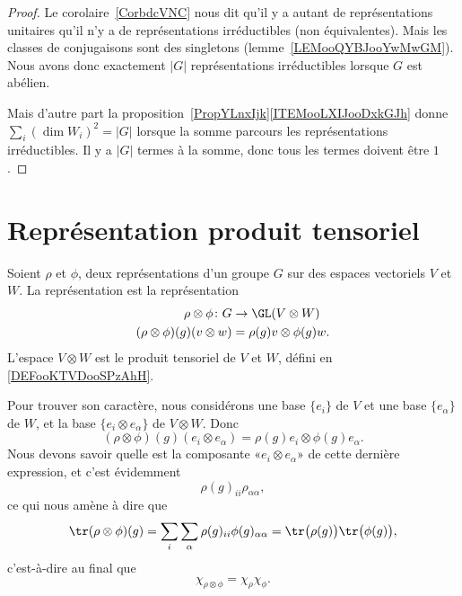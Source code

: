\begin{proof}
	Le corolaire~\ref{CorbdcVNC} nous dit qu'il y a autant de représentations unitaires qu'il n'y a de représentations irréductibles (non équivalentes). Mais les classes de conjugaisons sont des singletons (lemme~\ref{LEMooQYBJooYwMwGM}). Nous avons donc exactement \( | G |\) représentations irréductibles lorsque \( G\) est abélien.

	Mais d'autre part la proposition~\ref{PropYLnxIjk}\ref{ITEMooLXIJooDxkGJh} donne \( \sum_i(\dim W_i)^2=| G |\) lorsque la somme parcours les représentations irréductibles. Il y a \( | G |\) termes à la somme, donc tous les termes doivent être \( 1\).
\end{proof}

\section{Représentation produit tensoriel}

\begin{definition}
	Soient \( \rho\) et \( \phi\), deux représentations d'un groupe \( G\) sur des espaces vectoriels \( V\) et \( W\). La représentation  est la représentation
	\begin{equation}
		\begin{aligned}
			\rho\otimes\phi\colon G          & \to \GL(V\otimes W)        \\
			(\rho\otimes\phi)(g)(v\otimes w) & =\rho(g)v\otimes \phi(g)w.
		\end{aligned}
	\end{equation}
	L'espace \( V\otimes W\) est le produit tensoriel de \( V\) et \( W\), défini en \ref{DEFooKTVDooSPzAhH}.
\end{definition}
Pour trouver son caractère, nous considérons une base \( \{ e_i \}\) de \( V\) et une base \( \{ e_{\alpha} \}\) de \( W\), et la base \( \{ e_i\otimes e_{\alpha} \}\) de \( V\otimes W\). Donc
\begin{equation}
	(\rho\otimes \phi)(g)(e_i\otimes e_{\alpha})=\rho(g)e_i\otimes \phi(g)e_{\alpha}.
\end{equation}
Nous devons savoir quelle est la composante «\( e_i\otimes e_{\alpha}\)» de cette dernière expression, et c'est évidemment
\begin{equation}
	\rho(g)_{ii}\rho_{\alpha\alpha},
\end{equation}
ce qui nous amène à dire que
\begin{equation}
	\tr(\rho\otimes \phi)(g)=\sum_i\sum_{\alpha}\rho(g)_{ii}\phi(g)_{\alpha\alpha}=\tr\big( \rho(g) \big)\tr\big( \phi(g) \big),
\end{equation}
c'est-à-dire au final que
\begin{equation}    \label{EqOTmvfjf}
	\chi_{\rho\otimes \phi}=\chi_{\rho}\chi_{\phi}.
\end{equation}

